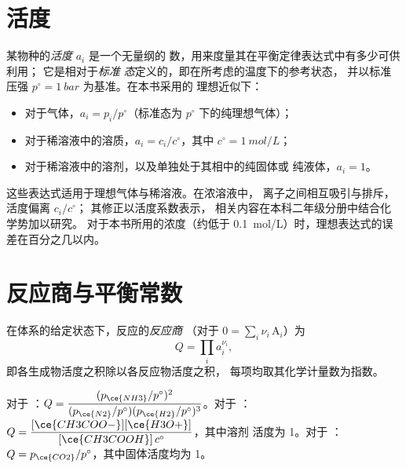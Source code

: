 \section{活度}

\begin{definition}[标准态，活度]\label{def:b1:extent-q-and-k:activity}
某物种的\emph{活度} $a_i$ 是一个无量纲的
数，用来度量其在平衡定律表达式中有多少可供利用；
它是相对于\emph{标准
态}定义的，即在所考虑的温度下的参考状态，
并以标准压强 $p^\circ = \qty{1}{bar}$ 为基准。在本书采用的
理想近似下：
\begin{itemize}
  \item 对于气体，$a_i = p_i/p^\circ$（标准态为
        $p^\circ$ 下的纯理想气体）；
  \item 对于稀溶液中的溶质，$a_i = c_i/c^\circ$，其中
        $c^\circ = \qty{1}{mol/L}$；
  \item 对于稀溶液中的溶剂，以及单独处于其相中的纯固体或
        纯液体，$a_i = 1$。
\end{itemize}
\end{definition}

\begin{remark}[理想与实际]\label{rem:b1:extent-q-and-k:ideal}
这些表达式适用于理想气体与稀溶液。在浓溶液中，
离子之间相互吸引与排斥，活度偏离 $c_i/c^\circ$；
其修正以活度系数表示，
相关内容在本科二年级分册中结合化学势加以研究。
对于本书所用的浓度（约低于
\qty{0.1}{mol/L}）时，理想表达式的误差在百分之几以内。
\end{remark}

\section{反应商与平衡常数}

\begin{definition}[反应商]\label{def:b1:extent-q-and-k:quotient}
在体系的给定状态下，反应的\emph{反应商}
（对于 $0 = \sum_i \nu_i\,\mathrm{A}_i$）为
\[
  Q = \prod_i a_i^{\nu_i} ,
\]
即各生成物活度之积除以各反应物活度之积，
每项均取其化学计量数为指数。
\end{definition}

\begin{example}[三个反应商]\label{ex:b1:extent-q-and-k:quotients}
对于 ：$Q = \dfrac{(p_{\ce{NH3}}/p^\circ)^2}
{(p_{\ce{N2}}/p^\circ)(p_{\ce{H2}}/p^\circ)^3}$。对于
：$Q =
\dfrac{[\ce{CH3COO-}][\ce{H3O+}]}{[\ce{CH3COOH}]\,c^\circ}$，其中溶剂
活度为 1。对于 ：$Q =
p_{\ce{CO2}}/p^\circ$，其中固体活度均为 1。
\end{example}

